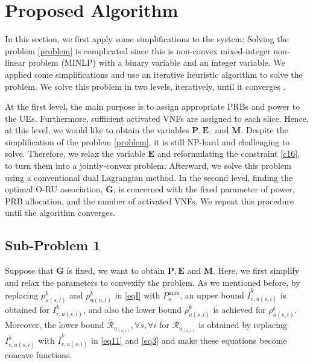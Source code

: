\documentclass[lettersize,journal]{IEEEtran}
\begin{document}
\section{Proposed Algorithm}\label{proAlg}
In this section, we first apply some simplifications to the system; Solving the problem \eqref{problem} is complicated since this is non-convex mixed-integer non-linear problem (MINLP) with a binary variable and an integer variable.
We applied some simplifications and use an iterative heuristic algorithm to solve the problem.
We solve this problem in two levels, iteratively, until it converges \cite{ali2018joint}.

At the first level, the main purpose is to assign appropriate PRBs and power to the UEs. Furthermore, sufficient activated VNFs are assigned to each slice. Hence, at this level, we would like to obtain the variables $\boldsymbol{P}, \boldsymbol{E},$ and $\boldsymbol{M}$.
Despite the simplification of the problem
\eqref{problem}, it is still NP-hard and challenging to solve. Therefore,
we relax the variable $\boldsymbol{E}$ \cite{lee2018dynamic,ali2018joint} and reformulating the constraint \eqref{c16},
to turn them into a jointly-convex problem; Afterward, we solve this problem using a conventional dual Lagrangian method.
In the second level, finding the optimal O-RU association, $ \boldsymbol{G}$, is concerned with the fixed parameter of power, PRB allocation, and the number of activated VNFs.
We repeat this procedure until the algorithm converges.

\subsection{Sub-Problem 1}\label{sub1}
Suppose that $\boldsymbol{G}$ is fixed, we want to obtain $\boldsymbol{P}, \boldsymbol{E}$ and $\boldsymbol{M}$.
Here, we first simplify and relax the parameters to convexify the problem.
As we mentioned before, by replacing $p_{u(s,l)}^{k}$ and $p_{u(n,l)}^{k}$ in \eqref{eqI} with $P^{\text{max}}_s$, an upper bound $\bar{I}_{r,u(s,i)}^{k}$ is obtained for $I_{r,u(s,i)}^{k}$, and also the lower bound $\bar{\rho}_{u(s,i)}^{k}$ is achieved
for $\rho_{u(s,i)}^{k}$.
Moreover, the lower bound $\bar{\mathcal{R}}_{u_{(s,i)}}, \forall s , \forall i$ for  ${\mathcal{R}}_{u_{(s,i)}}$ is obtained by replacing $I_{r,u(s,i)}^{k}$ with $\bar{I}_{r,u(s,i)}^{k}$ in \eqref{eq11} and \eqref{eq3} and make these equations become concave functions.
\end{document}
